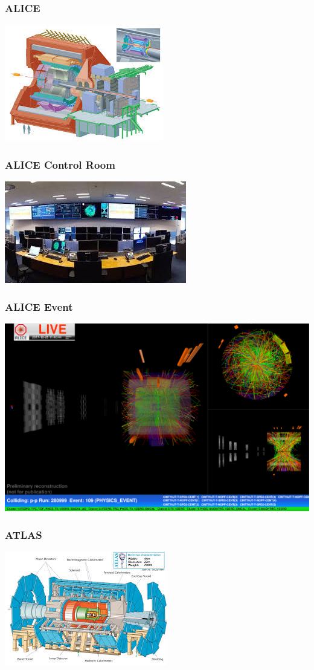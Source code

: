\documentclass{beamer}
\begin{document}
\begin{frame}
    \frametitle{ALICE}
    \includegraphics{ALICE.jpg}
\end{frame}
\begin{frame}
    \frametitle{ALICE Control Room}
    \includegraphics{ALICEControlRoom.jpg}
\end{frame}
\begin{frame}
    \frametitle{ALICE Event}
    \center\includegraphics[scale=0.1]{ALICEEvent.pdf}
\end{frame}
\begin{frame}
    \frametitle{ATLAS}
    \includegraphics{ATLAS.jpg}
\end{frame}
\end{document}
